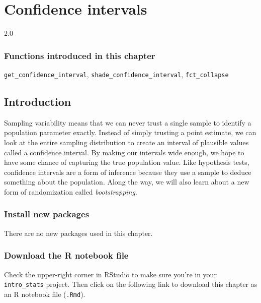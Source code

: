\documentclass[
]{book}
\begin{document}
\hypertarget{ci}{%
\chapter{Confidence intervals}\label{ci}}

2.0

\hypertarget{functions-introduced-in-this-chapter-11}{%
\subsection*{Functions introduced in this chapter}\label{functions-introduced-in-this-chapter-11}}

\texttt{get\_confidence\_interval}, \texttt{shade\_confidence\_interval}, \texttt{fct\_collapse}

\hypertarget{ci-intro}{%
\section{Introduction}\label{ci-intro}}

Sampling variability means that we can never trust a single sample to identify a population parameter exactly. Instead of simply trusting a point estimate, we can look at the entire sampling distribution to create an interval of plausible values called a confidence interval. By making our intervals wide enough, we hope to have some chance of capturing the true population value. Like hypothesis tests, confidence intervals are a form of inference because they use a sample to deduce something about the population. Along the way, we will also learn about a new form of randomization called \emph{bootstrapping}.

\hypertarget{ci-install}{%
\subsection{Install new packages}\label{ci-install}}

There are no new packages used in this chapter.

\hypertarget{ci-download}{%
\subsection{Download the R notebook file}\label{ci-download}}

Check the upper-right corner in RStudio to make sure you're in your \texttt{intro\_stats} project. Then click on the following link to download this chapter as an R notebook file (\texttt{.Rmd}).
\end{document}

